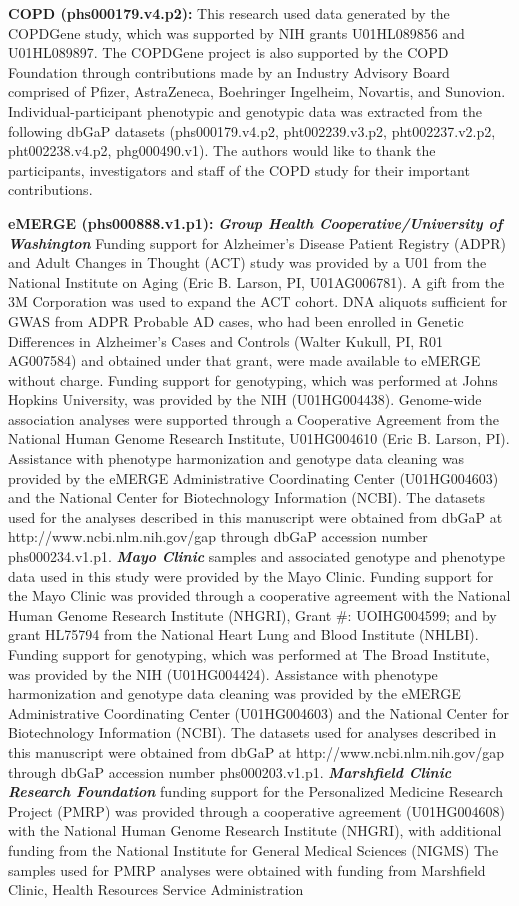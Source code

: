 \documentclass[12pt]{article}
\begin{document}
\textbf{COPD (phs000179.v4.p2):} This research used data generated by the COPDGene study, which was supported by NIH grants U01HL089856 and U01HL089897. The COPDGene project is also supported by the COPD Foundation through contributions made by an Industry Advisory Board comprised of Pfizer, AstraZeneca, Boehringer Ingelheim, Novartis, and Sunovion. Individual-participant phenotypic and genotypic data was extracted from the following dbGaP datasets (phs000179.v4.p2, pht002239.v3.p2, pht002237.v2.p2, pht002238.v4.p2, phg000490.v1). The authors would like to thank the participants, investigators and staff of the COPD study for their important contributions.

\textbf{eMERGE (phs000888.v1.p1):} \textbf{\textit{Group Health Cooperative/University of Washington}} Funding support for Alzheimer's Disease Patient Registry (ADPR) and Adult Changes in Thought (ACT) study was provided by a U01 from the National Institute on Aging (Eric B. Larson, PI, U01AG006781). A gift from the 3M Corporation was used to expand the ACT cohort. DNA aliquots sufficient for GWAS from ADPR Probable AD cases, who had been enrolled in Genetic Differences in Alzheimer's Cases and Controls (Walter Kukull, PI, R01 AG007584) and obtained under that grant, were made available to eMERGE without charge. Funding support for genotyping, which was performed at Johns Hopkins University, was provided by the NIH (U01HG004438). Genome-wide association analyses were supported through a Cooperative Agreement from the National Human Genome Research Institute, U01HG004610 (Eric B. Larson, PI). Assistance with phenotype harmonization and genotype data cleaning was provided by the eMERGE Administrative Coordinating Center (U01HG004603) and the National Center for Biotechnology Information (NCBI). The datasets used for the analyses described in this manuscript were obtained from dbGaP at http://www.ncbi.nlm.nih.gov/gap through dbGaP accession number phs000234.v1.p1. \textbf{\textit{Mayo Clinic}} samples and associated genotype and phenotype data used in this study were provided by the Mayo Clinic. Funding support for the Mayo Clinic was provided through a cooperative agreement with the National Human Genome Research Institute (NHGRI), Grant \#: UOIHG004599; and by grant HL75794 from the National Heart Lung and Blood Institute (NHLBI). Funding support for genotyping, which was performed at The Broad Institute, was provided by the NIH (U01HG004424). Assistance with phenotype harmonization and genotype data cleaning was provided by the eMERGE Administrative Coordinating Center (U01HG004603) and the National Center for Biotechnology Information (NCBI). The datasets used for analyses described in this manuscript were obtained from dbGaP at http://www.ncbi.nlm.nih.gov/gap through dbGaP accession number phs000203.v1.p1. \textbf{\textit{Marshfield Clinic Research Foundation}} funding support for the Personalized Medicine Research Project (PMRP) was provided through a cooperative agreement (U01HG004608) with the National Human Genome Research Institute (NHGRI), with additional funding from the National Institute for General Medical Sciences (NIGMS) The samples used for PMRP analyses were obtained with funding from Marshfield Clinic, Health Resources Service Administration 
\end{document}
